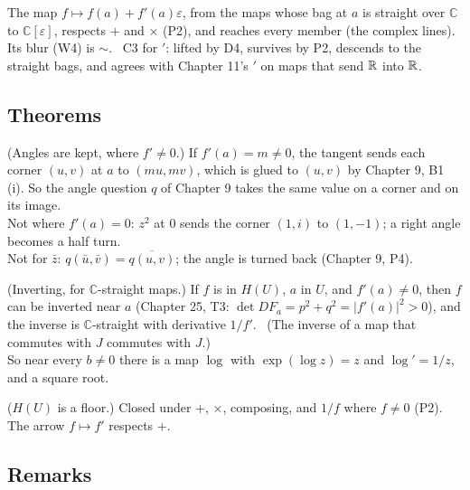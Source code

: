\begin{lines}
\item[\lab{P6}] The map $f \mapsto f(a) + f'(a)\varepsilon$, from the maps whose bag at $a$ is straight over $\mathbb{C}$ to $\mathbb{C}[\varepsilon]$, respects $+$ and $\times$ (P2), and reaches every member (the complex lines). Its blur (W4) is $\sim$. \ C3 for $'$: lifted by D4, survives by P2, descends to the straight bags, and agrees with Chapter 11's $'$ on maps that send $\mathbb{R}$ into $\mathbb{R}$.
\end{lines}

\subsection*{Theorems}

\begin{lines}
\item[\lab{T2}] (Angles are kept, where $f' \ne 0$.) If $f'(a) = m \ne 0$, the tangent sends each corner $(u, v)$ at $a$ to $(mu, mv)$, which is glued to $(u, v)$ by Chapter 9, B1 (i). So the angle question $q$ of Chapter 9 takes the same value on a corner and on its image. \\
Not where $f'(a) = 0$: $z^2$ at $0$ sends the corner $(1, i)$ to $(1, -1)$; a right angle becomes a half turn. \\
Not for $\bar z$: $q(\bar u, \bar v) = \overline{q(u, v)}$; the angle is turned back (Chapter 9, P4).
\item[\lab{T3}] (Inverting, for $\mathbb{C}$-straight maps.) If $f$ is in $H(U)$, $a$ in $U$, and $f'(a) \ne 0$, then $f$ can be inverted near $a$ (Chapter 25, T3: $\det DF_a = p^2 + q^2 = |f'(a)|^2 > 0$), and the inverse is $\mathbb{C}$-straight with derivative $1/f'$. \ (The inverse of a map that commutes with $J$ commutes with $J$.) \\
So near every $b \ne 0$ there is a map $\log$ with $\exp(\log z) = z$ and $\log' = 1/z$, and a square root.
\item[\lab{T4}] ($H(U)$ is a floor.) Closed under $+$, $\times$, composing, and $1/f$ where $f \ne 0$ (P2). The arrow $f \mapsto f'$ respects $+$.
\end{lines}

\subsection*{Remarks}

